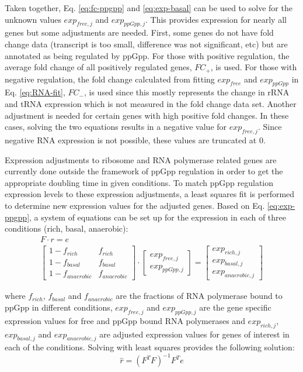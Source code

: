 \documentclass[12pt]{article}
\begin{document}
Taken together, Eq. \ref{eq:fc-ppgpp} and \ref{eq:exp-basal} can be used to solve for the unknown values $exp_{free, j}$ and $exp_{ppGpp, j}$.  This provides expression for nearly all genes but some adjustments are needed.  First, some genes do not have fold change data (transcript is too small, difference was not significant, etc) but are annotated as being regulated by ppGpp.  For those with positive regulation, the average fold change of all positively regulated genes, $FC_+$, is used.  For those with negative regulation, the fold change calculated from fitting $exp_{free}$ and $exp_{ppGpp}$ in Eq. \ref{eq:RNA-fit}, $FC_-$, is used since this mostly represents the change in rRNA and tRNA expression which is not measured in the fold change data set.  Another adjustment is needed for certain genes with high positive fold changes.  In these cases, solving the two equations results in a negative value for $exp_{free, j}$.  Since negative RNA expression is not possible, these values are truncated at 0.

Expression adjustments to ribosome and RNA polymerase related genes are currently done outside the framework of ppGpp regulation in order to get the appropriate doubling time in given conditions.  To match ppGpp regulation expression levels to these expression adjustments, a least squares fit is performed to determine new expression values for the adjusted genes.  Based on Eq. \ref{eq:exp-ppgpp}, a system of equations can be set up for the expression in each of three conditions (rich, basal, anaerobic):
\begin{gather}
F\cdot r = e \\
\begin{bmatrix}
1 - f_{rich} & f_{rich} \\
1 - f_{basal} & f_{basal} \\
1 - f_{anaerobic} & f_{anaerobic}
\end{bmatrix}
\cdot
\begin{bmatrix}
exp_{free, j} \\
exp_{ppGpp, j}
\end{bmatrix}
=
\begin{bmatrix}
exp_{rich, j} \\
exp_{basal, j} \\
exp_{anaerobic, j}
\end{bmatrix}
\end{gather}

\noindent where $f_{rich}$, $f_{basal}$ and $f_{anaerobic}$ are the fractions of RNA polymerase bound to ppGpp in different conditions, $exp_{free, j}$ and $exp_{ppGpp, j}$ are the gene specific expression values for free and ppGpp bound RNA polymerases and $exp_{rich, j}$, $exp_{basal, j}$ and $exp_{anaerobic, j}$ are adjusted expression values for genes of interest in each of the conditions.  Solving with least squares provides the following solution:
\begin{equation}
\hat{r} = (F^TF)^{-1}F^Te
\end{equation}
\end{document}

